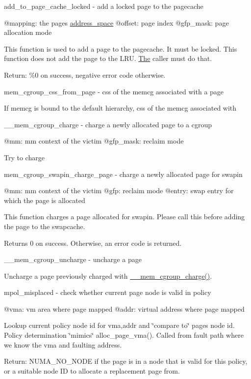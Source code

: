 add\+\_\+to\+\_\+page\+\_\+cache\+\_\+locked -\/ add a locked page to the pagecache

@mapping\+: the page\textquotesingle{}s \mbox{\hyperlink{structaddress__space}{address\+\_\+space}} @offset\+: page index @gfp\+\_\+mask\+: page allocation mode

This function is used to add a page to the pagecache. It must be locked. This function does not add the page to the L\+RU. \mbox{\hyperlink{classThe}{The}} caller must do that.

Return\+: \%0 on success, negative error code otherwise.

mem\+\_\+cgroup\+\_\+css\+\_\+from\+\_\+page -\/ css of the memcg associated with a page

If memcg is bound to the default hierarchy, css of the memcg associated with

\+\_\+\+\_\+mem\+\_\+cgroup\+\_\+charge -\/ charge a newly allocated page to a cgroup

@mm\+: mm context of the victim @gfp\+\_\+mask\+: reclaim mode

Try to charge

mem\+\_\+cgroup\+\_\+swapin\+\_\+charge\+\_\+page -\/ charge a newly allocated page for swapin

@mm\+: mm context of the victim @gfp\+: reclaim mode @entry\+: swap entry for which the page is allocated

This function charges a page allocated for swapin. Please call this before adding the page to the swapcache.

Returns 0 on success. Otherwise, an error code is returned.

\+\_\+\+\_\+mem\+\_\+cgroup\+\_\+uncharge -\/ uncharge a page

Uncharge a page previously charged with \mbox{\hyperlink{memcontrol_8c_a2b352dd524cd15d536fbfa8a765cf1af}{\+\_\+\+\_\+mem\+\_\+cgroup\+\_\+charge()}}.

mpol\+\_\+misplaced -\/ check whether current page node is valid in policy

@vma\+: vm area where page mapped @addr\+: virtual address where page mapped

Lookup current policy node id for vma,addr and \char`\"{}compare to\char`\"{} page\textquotesingle{}s node id. Policy determination \char`\"{}mimics\char`\"{} alloc\+\_\+page\+\_\+vma(). Called from fault path where we know the vma and faulting address.

Return\+: N\+U\+M\+A\+\_\+\+N\+O\+\_\+\+N\+O\+DE if the page is in a node that is valid for this policy, or a suitable node ID to allocate a replacement page from.

